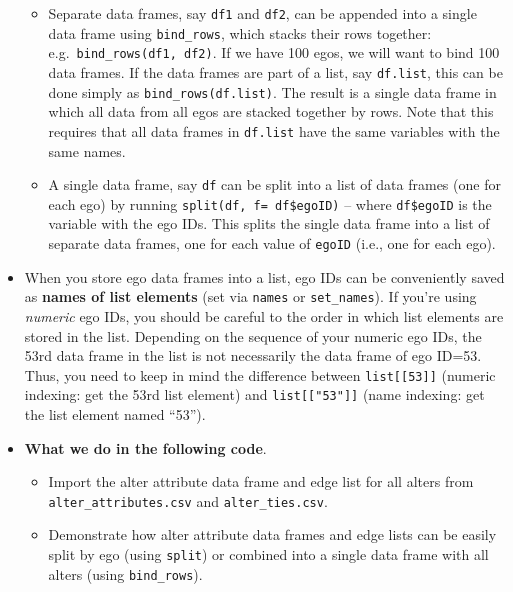 \documentclass[
]{book}
\providecommand{\tightlist}{%
  \setlength{\itemsep}{0pt}\setlength{\parskip}{0pt}}
\begin{document}
\begin{itemize}
  \begin{itemize}
  \tightlist
  \item
    Separate data frames, say \texttt{df1} and \texttt{df2}, can be appended into a single data frame using \texttt{bind\_rows}, which stacks their rows together: e.g.~\texttt{bind\_rows(df1,\ df2)}. If we have 100 egos, we will want to bind 100 data frames. If the data frames are part of a list, say \texttt{df.list}, this can be done simply as \texttt{bind\_rows(df.list)}. The result is a single data frame in which all data from all egos are stacked together by rows. Note that this requires that all data frames in \texttt{df.list} have the same variables with the same names.
  \item
    A single data frame, say \texttt{df} can be split into a list of data frames (one for each ego) by running \texttt{split(df,\ f=\ df\$egoID)} -- where \texttt{df\$egoID} is the variable with the ego IDs. This splits the single data frame into a list of separate data frames, one for each value of \texttt{egoID} (i.e., one for each ego).
  \end{itemize}
\item
  When you store ego data frames into a list, ego IDs can be conveniently saved as \textbf{names of list elements} (set via \texttt{names} or \texttt{set\_names}). If you're using \emph{numeric} ego IDs, you should be careful to the order in which list elements are stored in the list. Depending on the sequence of your numeric ego IDs, the 53rd data frame in the list is not necessarily the data frame of ego ID=53. Thus, you need to keep in mind the difference between \texttt{list{[}{[}53{]}{]}} (numeric indexing: get the 53rd list element) and \texttt{list{[}{[}"53"{]}{]}} (name indexing: get the list element named ``53'').
\item
  \textbf{What we do in the following code}.

  \begin{itemize}
  \tightlist
  \item
    Import the alter attribute data frame and edge list for all alters from \texttt{alter\_attributes.csv} and \texttt{alter\_ties.csv}.
  \item
    Demonstrate how alter attribute data frames and edge lists can be easily split by ego (using \texttt{split}) or combined into a single data frame with all alters (using \texttt{bind\_rows}).
  \end{itemize}
\end{itemize}
\end{document}
